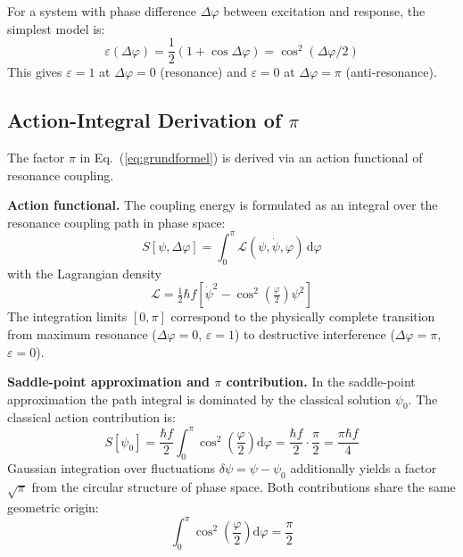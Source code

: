 \documentclass[12pt]{iopart}
\begin{document}
	For a system with phase difference $\Delta\varphi$
	between excitation and response, the simplest model is:
	\begin{equation}
		\varepsilon(\Delta\varphi) =
		\frac{1}{2}(1 + \cos\Delta\varphi)
		= \cos^2(\Delta\varphi/2)
		\label{eq:epsilon_cos}
	\end{equation}
	This gives $\varepsilon = 1$ at $\Delta\varphi = 0$
	(resonance) and $\varepsilon = 0$ at
	$\Delta\varphi = \pi$ (anti-resonance).
	
	\subsection{Action-Integral Derivation of $\pi$}
	\label{sec:pi_action}
	
	The factor $\pi$ in Eq.~(\ref{eq:grundformel}) is derived
	via an action functional of resonance coupling.
	
	\textbf{Action functional.}
	The coupling energy is formulated as an integral over the
	resonance coupling path in phase space:
	\begin{equation}
		S[\psi, \Delta\varphi]
		= \int_0^\pi \mathcal{L}(\psi, \dot\psi, \varphi)\,
		\mathrm{d}\varphi
		\label{eq:action_functional}
	\end{equation}
	with the Lagrangian density
	\begin{equation}
		\mathcal{L} = \tfrac{1}{2}\hbar f
		\!\left[\dot\psi^2
		- \cos^2\!\!\left(\tfrac{\varphi}{2}\right)\psi^2\right]
		\label{eq:lagrangian}
	\end{equation}
	The integration limits $[0,\pi]$ correspond to the
	physically complete transition from maximum resonance
	($\Delta\varphi = 0$, $\varepsilon = 1$) to destructive
	interference ($\Delta\varphi = \pi$, $\varepsilon = 0$).
	
	\textbf{Saddle-point approximation and $\pi$ contribution.}
	In the saddle-point approximation the path integral is
	dominated by the classical solution $\psi_0$. The
	classical action contribution is:
	\begin{equation}
		S[\psi_0]
		= \frac{\hbar f}{2}\int_0^\pi
		\cos^2\!\!\left(\frac{\varphi}{2}\right)\mathrm{d}\varphi
		= \frac{\hbar f}{2}\cdot\frac{\pi}{2}
		= \frac{\pi\hbar f}{4}
		\label{eq:saddle_action}
	\end{equation}
	Gaussian integration over fluctuations
	$\delta\psi = \psi - \psi_0$ additionally yields a factor
	$\sqrt{\pi}$ from the circular structure of phase space.
	Both contributions share the same geometric origin:
	\begin{equation}
		\int_0^\pi \cos^2\!\!\left(\frac{\varphi}{2}\right)
		\mathrm{d}\varphi = \frac{\pi}{2}
		\label{eq:half_period_integral}
	\end{equation}
	
\end{document}

